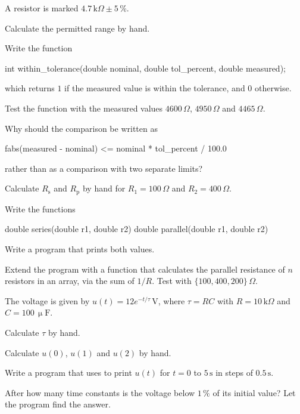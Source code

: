 A resistor is marked $4.7\,\text{k}\Omega \pm 5\,\%$.
\begin{parts}
  \item Calculate the permitted range by hand.
  \item Write the function
\begin{ccode}
int within_tolerance(double nominal, double tol_percent, double measured);
\end{ccode}
    which returns $1$ if the measured value is within the tolerance, and $0$ otherwise.
  \item Test the function with the measured values $4600\,\Omega$, $4950\,\Omega$ and
    $4465\,\Omega$.
  \item Why should the comparison be written as
\begin{ccode}
fabs(measured - nominal) <= nominal * tol_percent / 100.0
\end{ccode}
    rather than as a comparison with two separate limits?
\end{parts}

\begin{parts}
  \item Calculate $R_{\text{s}}$ and $R_{\text{p}}$ by hand for $R_1 = 100\,\Omega$ and
    $R_2 = 400\,\Omega$.
  \item Write the functions
\begin{ccode}
double series(double r1, double r2)
double parallel(double r1, double r2)
\end{ccode}
  \item Write a program that prints both values.
  \item Extend the program with a function that calculates the parallel resistance of $n$
    resistors in an array, via the sum of $1/R$. Test with $\{100, 400, 200\}\,\Omega$.
\end{parts}

The voltage is given by $u(t) = 12e^{-t/\tau}\,\text{V}$, where $\tau = RC$ with
$R = 10\,\text{k}\Omega$ and $C = 100\,\upmu\text{F}$.
\begin{parts}
  \item Calculate $\tau$ by hand.
  \item Calculate $u(0)$, $u(1)$ and $u(2)$ by hand.
  \item Write a program that uses  to print $u(t)$ for $t = 0$ to $5\,\text{s}$ in
    steps of $0.5\,\text{s}$.
  \item After how many time constants is the voltage below $1\,\%$ of its initial value? Let the
    program find the answer.
\end{parts}

